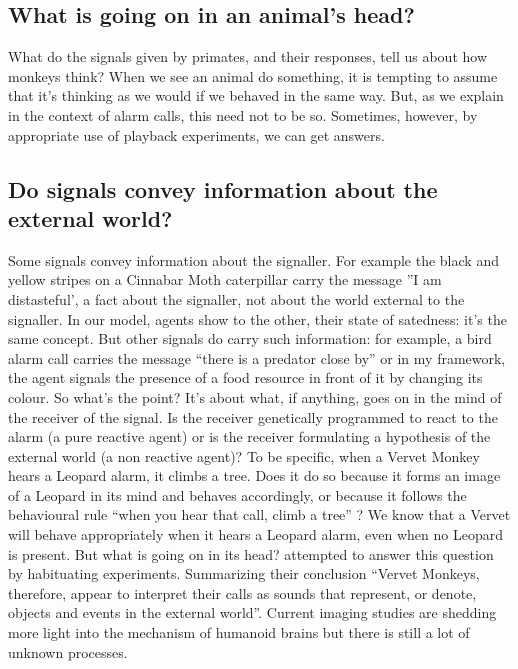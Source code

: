 \subsection{What is going on in an animal's head?}
What do the signals given by primates, and their responses, tell us about how monkeys think?
When we see an animal do something, it is tempting to assume that it's thinking as we
would if we behaved in the same way. But, as we explain in the context of alarm calls,
this need not to be so. Sometimes, however, by appropriate use of playback experiments,
we can get answers.
\subsection{Do signals convey information about the external world?}
Some signals convey information about the signaller. For example the black and yellow
stripes on a Cinnabar Moth caterpillar carry the message ''I am distasteful', a
fact about the signaller, not about the world external to the signaller.
In our model, agents show to the other, their state of satedness: it's the same concept.
But other signals do carry such information: for example, a bird alarm call carries the
message ``there is a predator close by'' or in my framework, the agent signals the
presence of a food resource in front of it by changing its colour. So what's the point?
It's about what, if anything, goes on in the mind of the receiver of the signal.
Is the receiver genetically programmed to react to the alarm (a pure reactive agent) or
is the receiver formulating a hypothesis of the external world (a non reactive agent)?
To be specific, when a Vervet Monkey hears a Leopard alarm, it climbs a tree.
Does it do so because it forms an image of a Leopard in its mind and behaves accordingly,
or because it follows the behavioural rule ``when you hear that call, climb a tree'' ?
We know that a Vervet will behave appropriately when it hears a Leopard alarm,
even when no Leopard is present.
But what is going on in its head? \citet{Seyfarth2000:AwarenessMonkey} attempted
to answer this question by habituating experiments.
Summarizing their conclusion ``Vervet Monkeys, therefore, appear to interpret
their calls as sounds that represent, or denote, objects and events in the external world''.
Current imaging studies are shedding more light into the mechanism of humanoid brains
 but there is still a lot of unknown processes.

